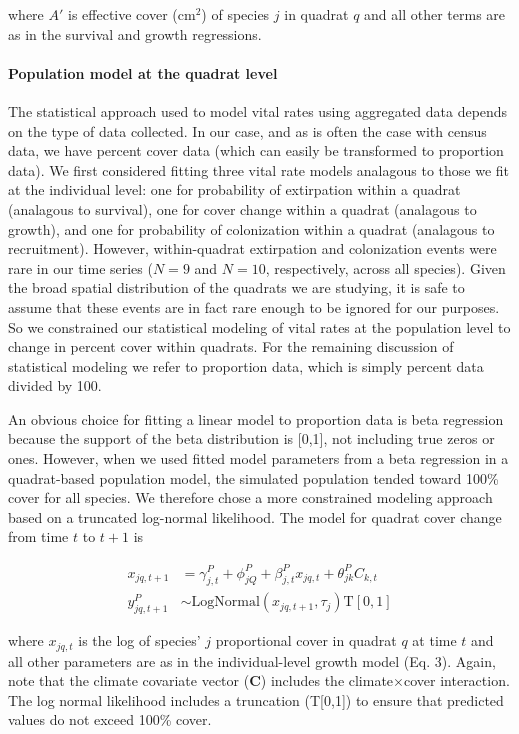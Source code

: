 \documentclass[12pt,]{article}
\begin{document}
where $A'$ is effective cover ($\text{cm}^2$) of species $j$ in quadrat
$q$ and all other terms are as in the survival and growth regressions.

\paragraph{Population model at the quadrat
level}\label{population-model-at-the-quadrat-level}

The statistical approach used to model vital rates using aggregated data
depends on the type of data collected. In our case, and as is often the
case with census data, we have percent cover data (which can easily be
transformed to proportion data). We first considered fitting three vital
rate models analagous to those we fit at the individual level: one for
probability of extirpation within a quadrat (analagous to survival), one
for cover change within a quadrat (analagous to growth), and one for
probability of colonization within a quadrat (analagous to recruitment).
However, within-quadrat extirpation and colonization events were rare in
our time series ($N=9$ and $N=10$, respectively, across all species).
Given the broad spatial distribution of the quadrats we are studying, it
is safe to assume that these events are in fact rare enough to be
ignored for our purposes. So we constrained our statistical modeling of
vital rates at the population level to change in percent cover within
quadrats. For the remaining discussion of statistical modeling we refer
to proportion data, which is simply percent data divided by 100.

An obvious choice for fitting a linear model to proportion data is beta
regression because the support of the beta distribution is {[}0,1{]},
not including true zeros or ones. However, when we used fitted model
parameters from a beta regression in a quadrat-based population model,
the simulated population tended toward 100\% cover for all species. We
therefore chose a more constrained modeling approach based on a
truncated log-normal likelihood. The model for quadrat cover change from
time $t$ to $t+1$ is

\begin{align}
x_{jq,t+1} &= \gamma^{P}_{j,t} + \phi^{P}_{jQ} + \beta^{P}_{j,t}x_{jq,t} + \theta^{P}_{jk}C_{k,t} \\
y^{P}_{jq,t+1} &\sim \text{LogNormal}(x_{jq,t+1}, \tau_{j}) \text{T}[0,1]
\end{align}

where $x_{jq,t}$ is the log of species' $j$ proportional cover in
quadrat $q$ at time $t$ and all other parameters are as in the
individual-level growth model (Eq. 3). Again, note that the climate
covariate vector (\textbf{C}) includes the climate$\times$cover
interaction. The log normal likelihood includes a truncation
(T{[}0,1{]}) to ensure that predicted values do not exceed 100\% cover.
\end{document}
